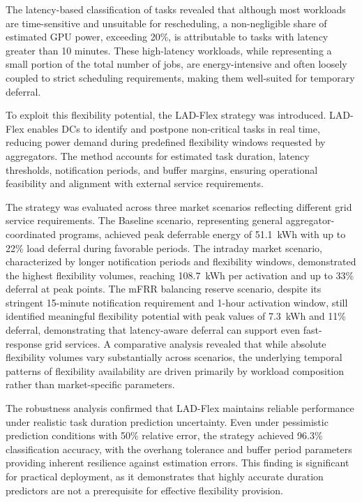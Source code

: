 \documentclass[preprint,12pt]{elsarticle}
\begin{document}
The latency-based classification of tasks revealed that although most workloads are time-sensitive and unsuitable for rescheduling, a non-negligible share of estimated GPU power, exceeding 20\%, is attributable to tasks with latency greater than 10 minutes. These high-latency workloads, while representing a small portion of the total number of jobs, are energy-intensive and often loosely coupled to strict scheduling requirements, making them well-suited for temporary deferral.

To exploit this flexibility potential, the LAD-Flex strategy was introduced. LAD-Flex enables DCs to identify and postpone non-critical tasks in real time, reducing power demand during predefined flexibility windows requested by aggregators. The method accounts for estimated task duration, latency thresholds, notification periods, and buffer margins, ensuring operational feasibility and alignment with external service requirements.

The strategy was evaluated across three market scenarios reflecting different grid service requirements. The Baseline scenario, representing general aggregator-coordinated programs, achieved peak deferrable energy of 51.1~kWh with up to 22\% load deferral during favorable periods. The intraday market scenario, characterized by longer notification periods and flexibility windows, demonstrated the highest flexibility volumes, reaching 108.7~kWh per activation and up to 33\% deferral at peak points. The mFRR balancing reserve scenario, despite its stringent 15-minute notification requirement and 1-hour activation window, still identified meaningful flexibility potential with peak values of 7.3~kWh and 11\% deferral, demonstrating that latency-aware deferral can support even fast-response grid services. A comparative analysis revealed that while absolute flexibility volumes vary substantially across scenarios, the underlying temporal patterns of flexibility availability are driven primarily by workload composition rather than market-specific parameters.

The robustness analysis confirmed that LAD-Flex maintains reliable performance under realistic task duration prediction uncertainty. Even under pessimistic prediction conditions with 50\% relative error, the strategy achieved 96.3\% classification accuracy, with the overhang tolerance and buffer period parameters providing inherent resilience against estimation errors. This finding is significant for practical deployment, as it demonstrates that highly accurate duration predictors are not a prerequisite for effective flexibility provision.
\end{document}
